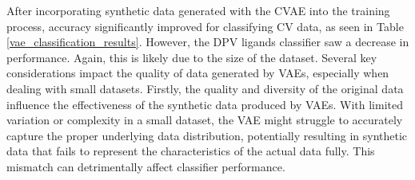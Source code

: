 After incorporating synthetic data generated with the CVAE into the training process, accuracy significantly improved for classifying CV data, as seen in Table \ref{vae_classification_results}. However, the DPV ligands classifier saw a decrease in performance. Again, this is likely due to the size of the dataset. Several key considerations impact the quality of data generated by VAEs, especially when dealing with small datasets. Firstly, the quality and diversity of the original data influence the effectiveness of the synthetic data produced by VAEs. With limited variation or complexity in a small dataset, the VAE might struggle to accurately capture the proper underlying data distribution, potentially resulting in synthetic data that fails to represent the characteristics of the actual data fully. This mismatch can detrimentally affect classifier performance. 

